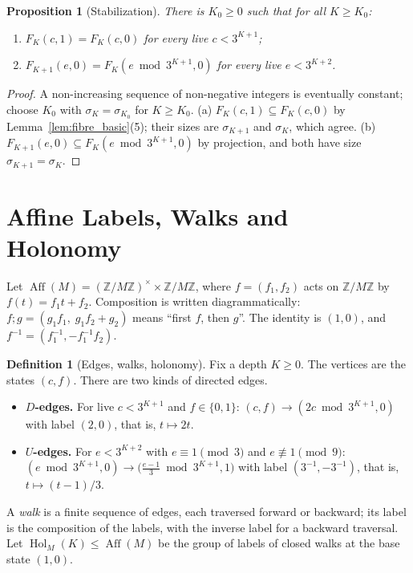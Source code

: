 \documentclass[11pt,reqno,oneside]{amsart}
\theoremstyle{plain}
\newtheorem{proposition}[theorem]{Proposition}
\theoremstyle{definition}
\newtheorem{definition}[theorem]{Definition}
\numberwithin{equation}{section}
\newcommand{\Z}{\mathbb{Z}}
\newcommand{\ZM}{\Z/M\Z}
\DeclareMathOperator{\Hol}{Hol}
\DeclareMathOperator{\Aff}{Aff}
\newcommand{\then}{\mathbin{;}}
\newcommand{\Fib}[3]{F_{#1}(#2,#3)}
\begin{document}
\begin{proposition}[Stabilization]\label{prop:stab}
There is $K_0\ge0$ such that for all $K\ge K_0$:
\begin{enumerate}[label=(\alph*), leftmargin=1.8em]
\item $\Fib Kc1=\Fib Kc0$ for every live $c<3^{K+1}$;
\item $\Fib{K+1}e0=\Fib K{e\bmod3^{K+1}}0$ for every live $e<3^{K+2}$.
\end{enumerate}
\end{proposition}
\begin{proof}
A non-increasing sequence of non-negative integers is eventually constant; choose $K_0$ with $\sigma_K=\sigma_{K_0}$ for $K\ge K_0$. (a) $\Fib Kc1\subseteq\Fib Kc0$ by Lemma~\ref{lem:fibre_basic}(5); their sizes are $\sigma_{K+1}$ and $\sigma_K$, which agree. (b) $\Fib{K+1}e0\subseteq\Fib K{e\bmod3^{K+1}}0$ by projection, and both have size $\sigma_{K+1}=\sigma_K$.
\end{proof}

\section{Affine Labels, Walks and Holonomy}\label{sec:affine}
Let $\Aff(M)=(\ZM)^\times\times\ZM$, where $f=(f_1,f_2)$ acts on $\ZM$ by $f(t)=f_1t+f_2$. Composition is written diagrammatically: $f\then g=(g_1f_1,\;g_1f_2+g_2)$ means ``first $f$, then $g$''. The identity is $(1,0)$, and $f^{-1}=(f_1^{-1},-f_1^{-1}f_2)$.

\begin{definition}[Edges, walks, holonomy]\label{def:edges}
Fix a depth $K\ge0$. The vertices are the states $(c,f)$. There are two kinds of directed edges.
\begin{itemize}
\item \textbf{$D$-edges.} For live $c<3^{K+1}$ and $f\in\{0,1\}$: $(c,f)\to(2c\bmod3^{K+1},0)$ with label $(2,0)$, that is, $t\mapsto2t$.
\item \textbf{$U$-edges.} For $e<3^{K+2}$ with $e\equiv1\pmod3$ and $e\not\equiv1\pmod9$: $(e\bmod3^{K+1},0)\to\bigl(\tfrac{e-1}{3}\bmod3^{K+1},1\bigr)$ with label $(3^{-1},-3^{-1})$, that is, $t\mapsto(t-1)/3$.
\end{itemize}
A \emph{walk} is a finite sequence of edges, each traversed forward or backward; its label is the composition of the labels, with the inverse label for a backward traversal. Let $\Hol_M(K)\le\Aff(M)$ be the group of labels of closed walks at the base state $(1,0)$.
\end{definition}
\end{document}
